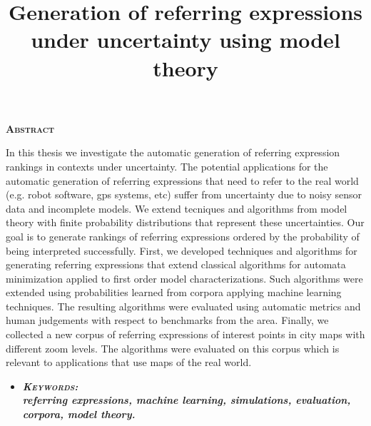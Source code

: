 \newpage

\begin{center}

{ \vspace*{1cm} }
\huge{\textbf{\textsc{\textmd{Abstract}}}}\\[1cm]

\end{center}

\title{Generation of referring expressions under uncertainty using model theory}

\normalsize{In this thesis we investigate the automatic generation of referring expression rankings in contexts under uncertainty. The potential applications for the automatic generation of referring expressions that need to refer to the real world (e.g. robot software, gps systems, etc) suffer from uncertainty due to noisy sensor data and incomplete models. We extend tecniques and algorithms from model theory with finite probability distributions that represent these uncertainties. Our goal is to generate rankings of referring expressions ordered by the probability of being interpreted successfully.
First, we developed techniques and algorithms for generating referring expressions that extend classical algorithms for automata minimization applied to first order model characterizations. Such algorithms were extended using probabilities learned from corpora applying machine learning techniques. The resulting algorithms were evaluated using automatic metrics  and human judgements with respect to benchmarks from the area. Finally, we collected a new corpus of referring expressions of interest points in city maps with different zoom levels. The algorithms were evaluated on this corpus which is relevant to applications that use maps of the real world.
}

\begin{itemize}

	\item \textbf{\emph{\textsc{Keywords:} \\ referring expressions, machine learning, simulations, evaluation, corpora, model theory.}}
\end{itemize}

